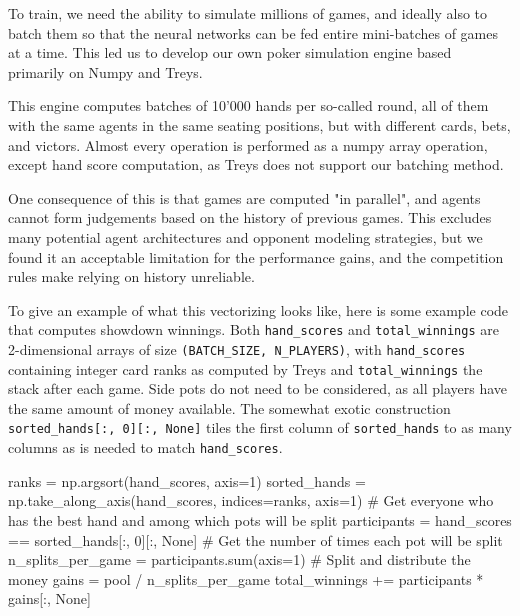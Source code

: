 To train, we need the ability to simulate millions of games, and ideally also to batch them so that the neural networks can be fed entire mini-batches of games at a time. This led us to develop our own poker simulation engine based primarily on Numpy \cite{Numpy} and Treys.

This engine computes batches of 10'000 hands per so-called round, all of them with the same agents in the same seating positions, but with different cards, bets, and victors. Almost every operation is performed as a numpy array operation, except hand score computation, as Treys does not support our batching method.

One consequence of this is that games are computed "in parallel", and agents cannot form judgements based on the history of previous games. This excludes many potential agent architectures and opponent modeling strategies, but we found it an acceptable limitation for the performance gains, and the competition rules make relying on history unreliable.

To give an example of what this vectorizing looks like, here is some example code that computes showdown winnings. Both \verb{hand_scores{ and \verb{total_winnings{ are 2-dimensional arrays of size \verb{(BATCH_SIZE, N_PLAYERS){, with \verb{hand_scores{ containing integer card ranks as computed by Treys and \verb{total_winnings{ the stack after each game. Side pots do not need to be considered, as all players have the same amount of money available. The somewhat exotic construction \verb{sorted_hands[:, 0][:, None]{ tiles the first column of \verb{sorted_hands{ to as many columns as is needed to match \verb{hand_scores{.
\begin{code}
ranks = np.argsort(hand_scores, axis=1)
sorted_hands = np.take_along_axis(hand_scores, indices=ranks, axis=1)
# Get everyone who has the best hand and among which pots will be split
participants = hand_scores == sorted_hands[:, 0][:, None]
# Get the number of times each pot will be split
n_splits_per_game = participants.sum(axis=1)
# Split and distribute the money
gains = pool / n_splits_per_game
total_winnings += participants * gains[:, None]
\end{code}


